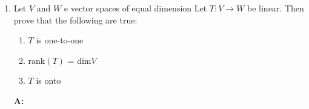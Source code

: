 \documentclass[english,course,fleqn]{lecture}
\newenvironment{qanda}{\begin{enumerate}\setlength{\parindent}{0pt}}{\medskip\end{enumerate}}
\newcommand{\Q}{\bigskip\bfseries \item}
\newcommand{\A}{\par\textbf{A:} \normalfont}
\begin{document}
\begin{qanda}
  \begin{gather*}
    \textbf{b. T(2,5); T(8,11)}\\
    \\
    T(2,5) = (-1,-3,-4)\\
    T(8,11) = (5,-3,16)
  \end{gather*}

  \begin{gather*}
    \textbf{c. \text{To find rank$(T)$ by Dimensional Theorem}}\\
    \\
    N(T) = \{x\in R^{2}:T(x) = 0\}\\
    x = (a_{1}, a_{2}) \in R^{2}\\
    T(x) = T(a_{1},a_{2}) = 0\\
    \implies (2 a_{1} - a_{2}, a_{1} - a_{2}, 2 a_{1}) = (0,0,0)\\
    \implies 2 a_{1} - a_{2} = 0; a_{1} - a_{2} = 0; 2 a_{1} = 0
    \implies a_{1} = 0; a_{2} = a_{1}\\
    \therefore x = (0,0)\\
    \therefore N(T) = \{(0,0) \in R^{2}:T(0,0) = 0\}\\
    \text{dim$(N(T)) = 0$}\\
    \text{nullity$T = 0$}\\
    \\
    \text{By Dimentional Theorem}\\
    \text{Nullity$(T)$ + rank$(T)$ = dim$(R^{2})$}\\
    0 + \text{rank$(T)$} = 2\\
    \text{rank$(T) = 2$}
  \end{gather*}

  \begin{gather*}
    \textbf{d. \text{Is $T$ onto?}}\\
    \\
    N(T) = \{0\}\\
    \implies T \text{ is one-to-one}\\
    \text{Rank$(T) = 2 = $ dim$(R^{2})$}\\
    \implies \text{dim$(R(T)) = 2$}\\
    \text{But dim$W$ = dim$(R^{3}) = 3$}\\
    \text{dim$(R(T)) < $  dim$(W)$}\\
    \therefore \text{There are some elements in $W$ which do not have pre-image.}
  \end{gather*}

  \Q Let $V$ and $W$ e vector spaces of equal dimension Let $T:V\rightarrow W$ be linear. Then prove that the following are true:

  \begin{enumerate}
    \item $T$ is one-to-one
    \item rank$(T)$ = dim$V$
    \item $T$ is onto
  \end{enumerate}

  \A 

  \begin{gather*}
  \end{gather*}

\end{qanda}
\end{document}
